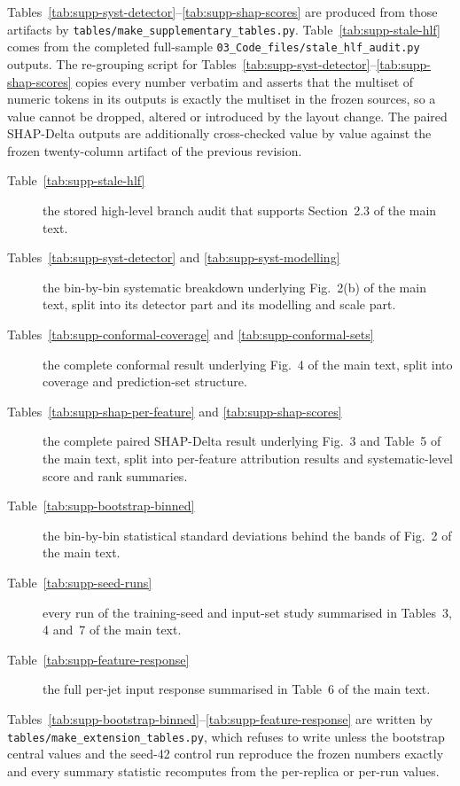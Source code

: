 \documentclass[11pt,a4paper,onecolumn]{article}
\begin{document}
Tables~\ref{tab:supp-syst-detector}--\ref{tab:supp-shap-scores} are produced
from those artifacts by \texttt{tables/make\_supplementary\_tables.py}.
Table~\ref{tab:supp-stale-hlf} comes from the completed full-sample
\texttt{03\_Code\_files/stale\_hlf\_audit.py} outputs. The re-grouping script for
Tables~\ref{tab:supp-syst-detector}--\ref{tab:supp-shap-scores} copies every
number verbatim and asserts that the multiset of numeric tokens in its outputs
is exactly the multiset in the frozen sources, so a value cannot be dropped,
altered or introduced by the layout change. The paired SHAP-Delta outputs are
additionally cross-checked value by value against the frozen twenty-column
artifact of the previous revision.

\begin{description}
  \item[Table~\ref{tab:supp-stale-hlf}] the stored high-level branch audit that
    supports Section~2.3 of the main text.
  \item[Tables~\ref{tab:supp-syst-detector} and \ref{tab:supp-syst-modelling}]
    the bin-by-bin systematic breakdown underlying Fig.~2(b) of the main text,
    split into its detector part and its modelling and scale part.
  \item[Tables~\ref{tab:supp-conformal-coverage} and \ref{tab:supp-conformal-sets}]
    the complete conformal result underlying Fig.~4 of the main text, split into
    coverage and prediction-set structure.
  \item[Tables~\ref{tab:supp-shap-per-feature} and \ref{tab:supp-shap-scores}]
    the complete paired SHAP-Delta result underlying Fig.~3 and Table~5 of the
    main text, split into per-feature attribution results and systematic-level
    score and rank summaries.
  \item[Table~\ref{tab:supp-bootstrap-binned}] the bin-by-bin statistical standard
    deviations behind the bands of Fig.~2 of the main text.
  \item[Table~\ref{tab:supp-seed-runs}] every run of the training-seed and input-set
    study summarised in Tables~3, 4 and~7 of the main text.
  \item[Table~\ref{tab:supp-feature-response}] the full per-jet input response
    summarised in Table~6 of the main text.
\end{description}

Tables~\ref{tab:supp-bootstrap-binned}--\ref{tab:supp-feature-response} are written by
\texttt{tables/make\_extension\_tables.py}, which refuses to write unless the bootstrap
central values and the seed-42 control run reproduce the frozen numbers exactly and
every summary statistic recomputes from the per-replica or per-run values.
\end{document}
